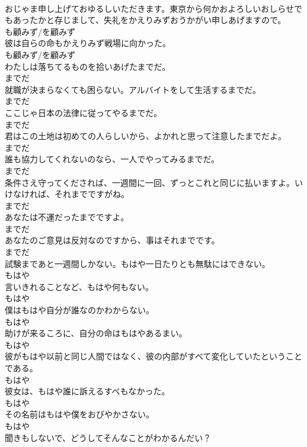 \documentclass[8pt]{extreport}
\begin{document}
\begin{CJK}{UTF8}{min}
\\	おじゃま申し上げておゆるしいただきます。東京から何かおよろしいおしらせでもあったかと存じまして、失礼をかえりみずおうかがい申しあげますので。	
\\	も顧みず/を顧みず
\\	彼は自らの命もかえりみず戦場に向かった。	
\\	も顧みず/を顧みず
\\	わたしは落ちてるものを拾いあげたまでだ。	
\\	までだ
\\	就職が決まらなくても困らない。アルバイトをして生活するまでだ。	
\\	までだ
\\	ここじゃ日本の法律に従ってやるまでだ。	
\\	までだ
\\	君はこの土地は初めての人らしいから、よかれと思って注意したまでだよ。	
\\	までだ
\\	誰も協力してくれないのなら、一人でやってみるまでだ。	
\\	までだ
\\	条件さえ守ってくだされば、一週間に一回、ずっとこれと同じに払いますよ。いけなければ、それまでですがね。	
\\	までだ
\\	あなたは不運だったまでですよ。	
\\	までだ
\\	あなたのご意見は反対なのですから、事はそれまでです。	
\\	までだ
\\	試験まであと一週間しかない。もはや一日たりとも無駄にはできない。	
\\	もはや
\\	言いきれることなど、もはや何もない。	
\\	もはや
\\	僕はもはや自分が誰なのかわからない。	
\\	もはや
\\	助けが来るころに、自分の命はもはやあるまい。	
\\	もはや
\\	彼がもはや以前と同じ人間ではなく、彼の内部がすべて変化していたということである。	
\\	もはや
\\	彼女は、もはや誰に訴えるすべもなかった。	
\\	もはや
\\	その名前はもはや僕をおびやかさない。	
\\	もはや
\\	聞きもしないで、どうしてそんなことがわかるんだい？	

\end{CJK}
\end{document}
